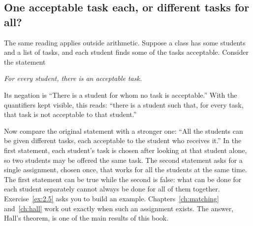 
\subsection*{One acceptable task each, or different tasks for all?}
The same reading applies outside arithmetic. Suppose a class has some students and a list of tasks, and each student finds some of the tasks acceptable. Consider the statement
\begin{center}
\emph{For every student, there is an acceptable task.}
\end{center}
Its negation is ``There is a student for whom no task is acceptable.'' With the quantifiers kept visible, this reads: ``there is a student such that, for every task, that task is not acceptable to that student.''

Now compare the original statement with a stronger one: ``All the students can be given different tasks, each acceptable to the student who receives it.'' In the first statement, each student's task is chosen after looking at that student alone, so two students may be offered the same task. The second statement asks for a single assignment, chosen once, that works for all the students at the same time. The first statement can be true while the second is false: what can be done for each student separately cannot always be done for all of them together. Exercise~\ref{ex:2.5} asks you to build an example. Chapters~\ref{ch:matching} and~\ref{ch:hall} work out exactly when such an assignment exists. The answer, Hall's theorem, is one of the main results of this book.

